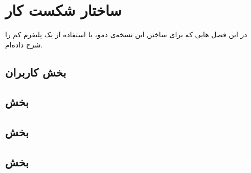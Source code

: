 \chapter{ساختار شکست کار}
در این فصل 
هایی
که برای ساختن این نسخه‌ی دمو، با استفاده از یک پلتفرم کم را شرح داده‌ام.

\section{بخش کاربران}
\section{بخش }
\section{بخش }
\section{بخش }
